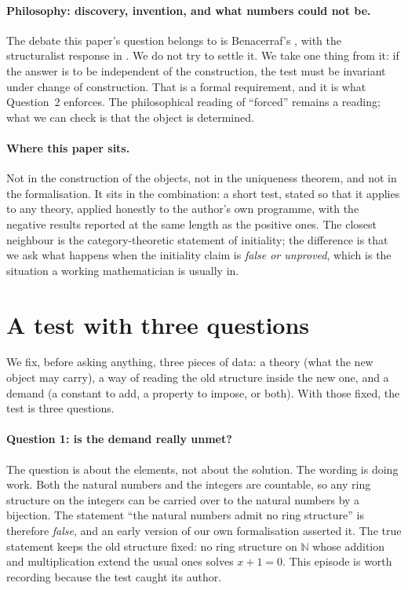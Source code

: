 \documentclass[aps,prd,preprint,superscriptaddress,amsmath,amssymb]{revtex4-2}
\begin{document}
\paragraph{Philosophy: discovery, invention, and what numbers could not be.}
The debate this paper's question belongs to is Benacerraf's
\cite{benacerraf1965}, with the structuralist response in \cite{shapiro1997}.
We do not try to settle it.  We take one thing from it: if the answer is to be
independent of the construction, the test must be invariant under change of
construction.  That is a formal requirement, and it is what Question~2 enforces.
The philosophical reading of ``forced'' remains a reading; what we can check is
that the object is determined.

\paragraph{Where this paper sits.}
Not in the construction of the objects, not in the uniqueness theorem, and not in
the formalisation.  It sits in the combination: a short test, stated so that it
applies to any theory, applied honestly to the author's own programme, with the
negative results reported at the same length as the positive ones.  The closest
neighbour is the category-theoretic statement of initiality; the difference is
that we ask what happens when the initiality claim is \emph{false or unproved},
which is the situation a working mathematician is usually in.


\section{A test with three questions}
\label{sec:test}

We fix, before asking anything, three pieces of data: a theory (what the new
object may carry), a way of reading the old structure inside the new one, and a
demand (a constant to add, a property to impose, or both).  With those fixed, the
test is three questions.

\paragraph{Question 1: is the demand really unmet?}
The question is about the elements, not about the solution.  The wording is doing
work.  Both the natural numbers and the integers are countable, so any ring
structure on the integers can be carried over to the natural numbers by a
bijection.  The statement ``the natural numbers admit no ring structure'' is
therefore \emph{false}, and an early version of our own formalisation asserted it.
The true statement keeps the old structure fixed: no ring structure on
$\mathbb{N}$ whose addition and multiplication extend the usual ones solves
$x+1=0$.  This episode is worth recording because the test caught its author.
\end{document}
